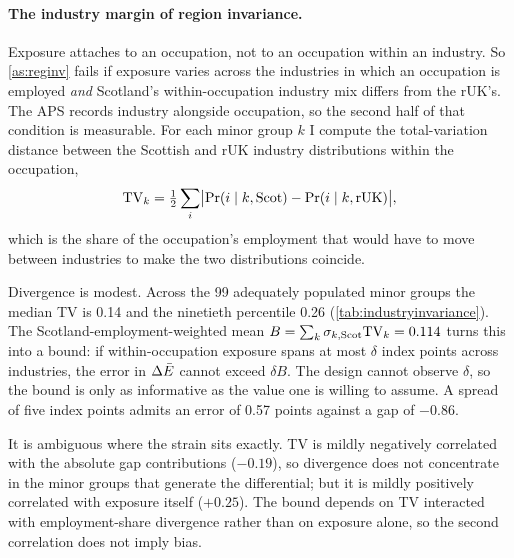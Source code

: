 \paragraph{The industry margin of region invariance.} Exposure attaches to an occupation, not to an occupation within an industry. So \cref{as:reginv} fails if exposure varies across the industries in which an occupation is employed \emph{and} Scotland's within-occupation industry mix differs from the rUK's. The APS records industry alongside occupation, so the second half of that condition is measurable. For each minor group $k$ I compute the total-variation distance between the Scottish and rUK industry distributions within the occupation,
\begin{equation*}
\mathrm{TV}_k = \tfrac{1}{2} \sum_i \bigl| \Pr(i \mid k, \mathrm{Scot})
- \Pr(i \mid k, \mathrm{rUK}) \bigr|,
\end{equation*}
which is the share of the occupation's employment that would have to move between industries to make the two distributions coincide.

Divergence is modest. Across the 99 adequately populated minor groups the median TV is 0.14 and the ninetieth percentile 0.26 (\cref{tab:industryinvariance}). The Scotland-employment-weighted mean $B = \sum_k \sigma_{k,\mathrm{Scot}}\mathrm{TV}_k = 0.114$ turns this into a bound: if within-occupation exposure spans at most $\delta$ index points across industries, the error in $\Delta\bar{E}$ cannot exceed $\delta B$. The design cannot observe $\delta$, so the bound is only as informative as the value one is willing to assume. A spread of five index points admits an error of 0.57 points against a gap of $-0.86$.

It is ambiguous where the strain sits exactly. TV is mildly negatively correlated with the absolute gap contributions ($-0.19$), so divergence does not concentrate in the minor groups that generate the differential; but it is mildly positively correlated with exposure itself ($+0.25$). The bound depends on TV interacted with employment-share divergence rather than on exposure alone, so the second correlation does not imply bias. 
 
